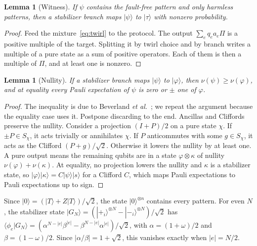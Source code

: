 \documentclass[aps,prl,reprint,twocolumn,amsmath,amssymb,floatfix,nofootinbib,superscriptaddress]{revtex4-2}
\newtheorem{lemma}[theorem]{Lemma}
\begin{document}
\begin{lemma}[Witness]\label{lem:witness}
If $\psi$ contains the fault-free pattern and only harmless patterns, then a stabilizer branch maps $|\psi\rangle$ to $|\tau\rangle$ with nonzero probability.
\end{lemma}
\begin{proof}
Feed the mixture~\eqref{eq:twirl} to the protocol. The output $\sum_eq_ea_e\Pi$ is a positive multiple of the target. Splitting it by twirl choice and by branch writes a multiple of a pure state as a sum of positive operators. Each of them is then a multiple of $\Pi$, and at least one is nonzero.
\end{proof}

\begin{lemma}[Nullity]\label{lem:nullity}
If a stabilizer branch maps $|\psi\rangle$ to $|\varphi\rangle$, then $\nu(\psi)\geq\nu(\varphi)$, and at equality every Pauli expectation of $\psi$ is zero or $\pm$ one of $\varphi$.
\end{lemma}
\begin{proof}
The inequality is due to Beverland \emph{et al.}~\cite[Proposition~2.3]{beverland}; we repeat the argument because the equality case uses it.
Postpone discarding to the end. Ancillas and Cliffords preserve the nullity. Consider a projection $(I+P)/2$ on a pure state $\chi$. If $\pm P\in S_\chi$, it acts trivially or annihilates $\chi$. If $P$ anticommutes with some $g\in S_\chi$, it acts as the Clifford $(P+g)/\sqrt2$. Otherwise it lowers the nullity by at least one. A pure output means the remaining qubits are in a state $\varphi\otimes\kappa$ of nullity $\nu(\varphi)+\nu(\kappa)$. At equality, no projection lowers the nullity and $\kappa$ is a stabilizer state, so $|\varphi\rangle|\kappa\rangle=C|\psi\rangle|s\rangle$ for a Clifford $C$, which maps Pauli expectations to Pauli expectations up to sign.
\end{proof}

Since $|0\rangle=(|T\rangle+Z|T\rangle)/\sqrt2$, the state $|0\rangle^{\otimes n}$ contains every pattern. For even $N$, the stabilizer state $|G_N\rangle=(|{+_i}\rangle^{\otimes N}-|{-_i}\rangle^{\otimes N})/\sqrt2$ has $\langle\phi_e|G_N\rangle=(\alpha^{N-|e|}\beta^{|e|}-\beta^{N-|e|}\alpha^{|e|})/\sqrt2$, with $\alpha=(1+\omega)/2$ and $\beta=(1-\omega)/2$. Since $|\alpha/\beta|=1+\sqrt2$, this vanishes exactly when $|e|=N/2$.
\end{document}
